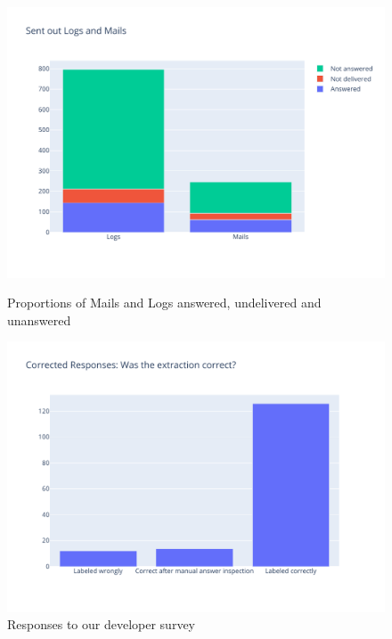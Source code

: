 \documentclass[\myrootdir/main.tex]{subfiles}
\begin{document}
\begin{figure}[h]
	\centering
	\begin{minipage}{0.45\textwidth}
		\centering
		\includegraphics[width=\textwidth, clip]{img/dev-mails/answers-received.pdf}
		\caption{Proportions of Mails and Logs answered, undelivered and unanswered}
		\label{fig:mails-answers-received}
	\end{minipage}\hfill
	\begin{minipage}{0.45\textwidth}
		\centering
		\includegraphics[width=\textwidth, clip]{img/dev-mails/extraction-correct.pdf}
		\caption{Responses to our developer survey}
		\label{fig:mails-extraction-correct}
	\end{minipage}
\end{figure}
\end{document}
